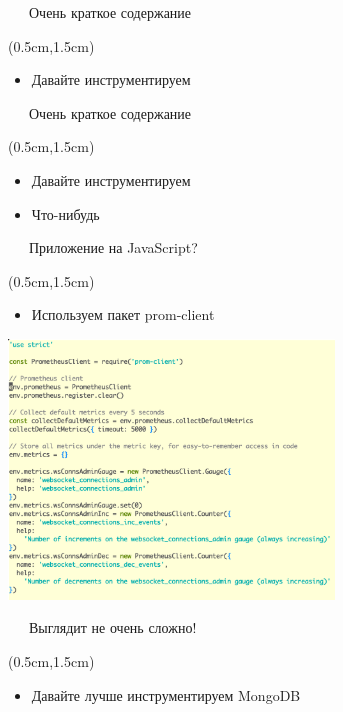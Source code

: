 \documentclass[xetex,18pt,aspectratio=43]{beamer}
\begin{document}
\begin{Large}

\begin{frame}{\ \ \ Очень краткое содержание}
\begin{textblock*}{\framewidth-0.8cm}(0.5cm,1.5cm)
\begin{itemize}
  \item Давайте инструментируем
\end{itemize}
\end{textblock*}
\end{frame}

\begin{frame}{\ \ \ Очень краткое содержание}
\begin{textblock*}{\framewidth-0.8cm}(0.5cm,1.5cm)
\begin{itemize}
  \item Давайте инструментируем
  \item Что-нибудь
\end{itemize}
\end{textblock*}
\end{frame}

\begin{frame}{\ \ \ Приложение на JavaScript?}
\begin{textblock*}{\framewidth-0.8cm}(0.5cm,1.5cm)
\begin{itemize}
  \item Используем пакет prom-client
\end{itemize}
\begin{minipage}{\textwidth}
  \centering
  \includegraphics[height=6.9cm]{img/javascript}
\end{minipage}
\end{textblock*}
\end{frame}

\begin{frame}{\ \ \ Выглядит не очень сложно!}
\begin{textblock*}{\framewidth-0.8cm}(0.5cm,1.5cm)
\begin{itemize}
  \item Давайте лучше инструментируем MongoDB
\end{itemize}
\end{textblock*}
\end{frame}


\end{Large}
\end{document}
